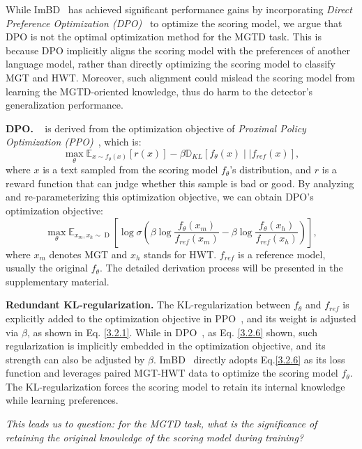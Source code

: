 While ImBD~\cite{imbd} has achieved significant performance gains by incorporating \textit{Direct Preference Optimization (DPO)}~\cite{dpo} to optimize the scoring model, we argue that DPO is not the optimal optimization method for the MGTD task.
%
This is because DPO implicitly aligns the scoring model with the preferences of another language model, rather than directly optimizing the scoring model to classify MGT and HWT. 
%
Moreover, such alignment could mislead the scoring model from learning the MGTD-oriented knowledge, thus do harm to the detector's generalization performance.


\noindent \textbf{DPO.}
~\cite{dpo} is derived from the optimization objective of \textit{Proximal Policy Optimization (PPO)}~\cite{ppo}, which is:
\begin{equation}
    \mathop{max}_\theta \mathbb{E}_{x\sim f_\theta(x)}[r(x)] - \beta\mathbb{D}_{KL}[f_\theta(x) \mid \mid f_{ref}(x)],
    \label{3.2.1}
\end{equation}
where $x$ is a text sampled from the scoring model $f_\theta$'s distribution, and $r$ is a reward function that can judge whether this sample is bad or good.
%
By analyzing and re-parameterizing this optimization objective, we can obtain DPO's optimization objective:
\begin{equation}
    \mathop{max}_\theta \mathbb{E}_{x_m, x_h \sim \mathop{D}}[\log \sigma(\beta\log\frac{f_\theta(x_m)}{f_{ref}(x_m)}-\beta\log\frac{f_\theta(x_h)}{f_{ref}(x_h)})],
    \label{3.2.6}
\end{equation}
where $x_m$ denotes MGT and $x_h$ stands for HWT.
%
$f_{ref}$ is a reference model, usually the original $f_\theta$.
%
The detailed derivation process will be presented in the supplementary material.

\noindent \textbf{Redundant KL-regularization. }\label{redundant KL-regularization}
The KL-regularization between $f_\theta$ and $f_{ref}$ is explicitly added to the optimization objective in PPO~\cite{ppo}, and its weight is adjusted via $\beta$, as shown in Eq. \eqref{3.2.1}.
%
While in DPO~\cite{dpo}, as Eq. 
\eqref{3.2.6} shown, such regularization is implicitly embedded in the optimization objective, and its strength can also be adjusted by $\beta$.
%
ImBD~\cite{imbd} directly adopts Eq.\eqref{3.2.6} as its loss function and leverages paired MGT-HWT data to optimize the scoring model $f_\theta$.
%
The KL-regularization forces the scoring model to retain its internal knowledge while learning preferences.

\textit{This leads us to question: for the MGTD task, what is the significance of retaining the original knowledge of the scoring model during training?}

